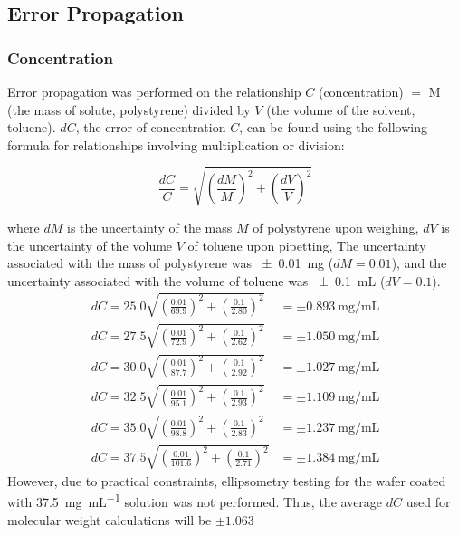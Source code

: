 \documentclass[twocolumn]{article}
\begin{document}
            \subsection{Error Propagation}
                \subsubsection{Concentration}
                    Error propagation was performed on the relationship $C$ (concentration) $=$ M (the mass of solute, polystyrene) divided by $V$ (the volume of the solvent, toluene). $dC$, the error of concentration $C$, can be found using the following formula for relationships involving multiplication or division: 
                    
                    \begin{equation}
                        \frac{dC}{C} = \sqrt{(\frac{dM}{M})^2 + (\frac{dV}{V})^2}
                    \end{equation}
                    
                    where $dM$ is the uncertainty of the mass $M$ of polystyrene upon weighing, $dV$ is the uncertainty of the volume $V$ of toluene upon pipetting, The uncertainty associated with the mass of polystyrene was \qty{\pm 0.01}{\milli\gram} ($dM = 0.01$), and the uncertainty associated with the volume of toluene was \qty{\pm 0.1}{\milli\liter} ($dV = 0.1$). 
                    \begin{align}
                        dC = 25.0\sqrt{(\frac{0.01}{69.9})^2 + (\frac{0.1}{2.80})^2} &= \pm \qty{0.893}{\milli\gram\per\milli\liter}\\
                        dC = 27.5\sqrt{(\frac{0.01}{72.9})^2 + (\frac{0.1}{2.62})^2} &= \pm \qty{1.050}{\milli\gram\per\milli\liter}\\
                        dC = 30.0\sqrt{(\frac{0.01}{87.7})^2 + (\frac{0.1}{2.92})^2} &= \pm \qty{1.027}{\milli\gram\per\milli\liter}\\
                        dC = 32.5\sqrt{(\frac{0.01}{95.1})^2 + (\frac{0.1}{2.93})^2} &= \pm \qty{1.109}{\milli\gram\per\milli\liter}\\
                        dC = 35.0\sqrt{(\frac{0.01}{98.8})^2 + (\frac{0.1}{2.83})^2} &= \pm \qty{1.237}{\milli\gram\per\milli\liter}\\
                        dC = 37.5\sqrt{(\frac{0.01}{101.6})^2 + (\frac{0.1}{2.71})^2} &= \pm \qty{1.384}{\milli\gram\per\milli\liter}
                    \end{align}
                    However, due to practical constraints, ellipsometry testing for the wafer coated with \qty{37.5}{\milli\gram\per\milli\liter} solution was not performed. Thus, the average $dC$ used for molecular weight calculations will be $\pm 1.063$
\end{document}
